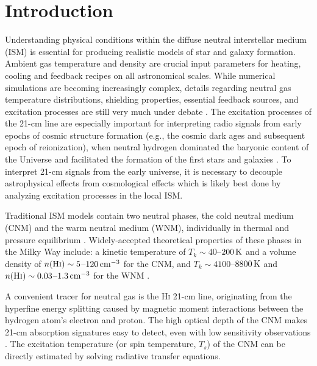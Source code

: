 \documentclass{aastex}
\begin{document}

\section{Introduction}

Understanding physical conditions within the diffuse 
neutral interstellar medium (ISM) is essential for 
producing realistic models of star and galaxy formation. 
Ambient gas temperature and density are crucial input 
parameters for heating, cooling and feedback recipes 
on all astronomical scales.  While numerical simulations 
are becoming increasingly complex, details regarding neutral 
gas temperature distributions, shielding properties, 
essential feedback sources, and excitation processes 
are still very much under debate \citep{Bryan07,Christensen12}.
The excitation processes of the 21-cm line are especially
important for interpreting radio signals from early
epochs of cosmic structure formation (e.g., the cosmic
dark ages and subsequent epoch of reionization), when
neutral hydrogen dominated the baryonic content of the 
Universe and facilitated the formation of the first stars 
and galaxies \citep{Pritchard12}.  To interpret 21-cm 
signals from the early universe, it is necessary to 
decouple astrophysical effects from cosmological effects 
which is likely best done by analyzing excitation processes 
in the local ISM. 

Traditional ISM models contain two neutral phases, the 
cold neutral medium (CNM) and the warm neutral medium (WNM), 
individually in thermal and pressure 
equilibrium \citep{Field69,MO77,Wolfire03}.
Widely-accepted theoretical properties of these phases in 
the Milky Way include: a kinetic temperature of
$T_k\sim40$--$200\rm\,K$ and a volume density of 
$n(\rm H\textsc{i})\sim5$--$120\rm\,cm^{-3}$
for the CNM, and $T_k\sim4100$--$8800\rm\,K$ and 
$n(\rm H\textsc{i})\sim0.03$--$1.3\rm\,cm^{-3}$ for 
the WNM \citep{Wolfire03}. 

A convenient tracer for neutral gas is the 
H\textsc{i} 21-cm line, originating from 
the hyperfine energy splitting caused by magnetic moment 
interactions between the hydrogen atom's electron and proton.
The high optical depth of the CNM makes 21-cm absorption 
signatures easy to detect, even with low sensitivity 
observations \citep[e.g., ][]{Lazareff75,Dickey77,Crovisier78,PDST78,Dickey83,BW92,HT031,K03,Mohan04,Roy06,Begum}. 
The excitation temperature (or spin temperature, $T_s$)
of the CNM can be directly estimated by solving radiative 
transfer equations.
\end{document}
